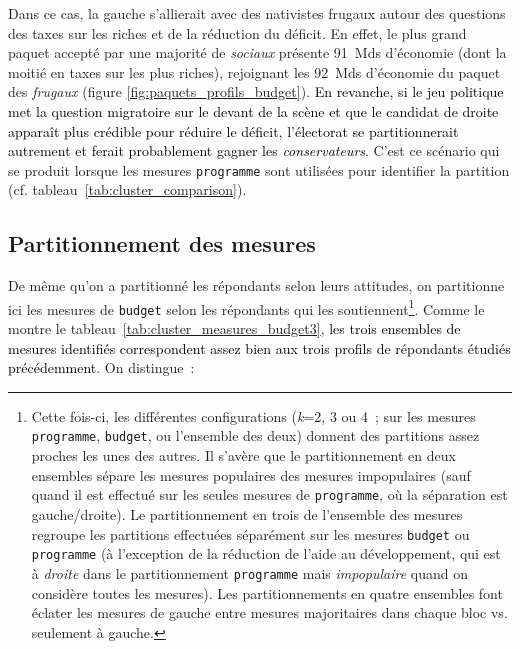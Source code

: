 \documentclass[12pt,french]{article}
\newcommand{\blue}[1]{\textcolor{black}{#1}} %
\begin{document}
Dans ce cas, la gauche s'allierait avec des nativistes frugaux autour des questions des taxes sur les riches et de la réduction du déficit. En effet, le plus grand paquet accepté par une majorité de \textit{sociaux} présente 91~Mds d'économie (dont la moitié en taxes sur les plus riches), rejoignant les 92~Mds d'économie du paquet des \textit{frugaux} (figure \ref{fig:paquets_profils_budget}). \blue{En revanche, si le jeu politique met la question migratoire sur le devant de la scène et que le candidat de droite apparaît plus crédible pour réduire le déficit, l'électorat se partitionnerait autrement et ferait probablement gagner les \textit{conservateurs}.} C'est ce scénario qui se produit lorsque les mesures \texttt{programme} sont utilisées pour identifier la partition (cf. tableau~\ref{tab:cluster_comparison}).





\subsection{Partitionnement des mesures}


De même qu'on a partitionné les répondants selon leurs attitudes, on %
partitionne ici les mesures de \texttt{budget} selon les répondants qui les soutiennent\footnote{Cette fois-ci, les différentes configurations (\textit{k}=2, 3 ou 4~; sur les mesures \texttt{programme}, \texttt{budget}, ou l'ensemble des deux) donnent des partitions assez proches les unes des autres. Il s'avère que le partitionnement en deux ensembles sépare les mesures populaires des mesures impopulaires (sauf quand il est effectué sur les seules mesures de \texttt{programme}, où la séparation est gauche/droite). Le partitionnement en trois de l'ensemble des mesures regroupe les partitions effectuées séparément sur les mesures \texttt{budget} ou \texttt{programme} (à l'exception de la réduction de l'aide au développement, qui est à \textit{droite} dans le partitionnement \texttt{programme} mais \textit{impopulaire} quand on considère toutes les mesures). Les partitionnements en quatre ensembles font éclater les mesures de gauche entre mesures majoritaires dans chaque bloc vs. seulement à gauche.}. 
Comme le montre le tableau~\ref{tab:cluster_measures_budget3}, \blue{les trois ensembles de mesures identifiés correspondent assez bien aux trois profils de répondants étudiés précédemment}. On distingue~:
\end{document}
